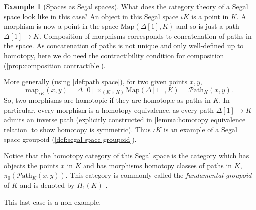 \documentclass[11pt, a4paper]{amsart}
\newcommand{\Map}{\mathrm{Map}}
\newcommand{\map}{\mathrm{map}}
\newcommand{\Path}{\mathscr{P}\mathrm{ath}}
\theoremstyle{definition}
\newtheorem{example}[equation]{Example}
\theoremstyle{remark}
\numberwithin{equation}{section}
\begin{document}
\begin{example}[Spaces as Segal spaces]
  What does the category theory of a Segal space look like in this case? An object in this Segal space $\iota K$ is a point in $K$. A morphism is now a point in the space $\Map(\Delta[1],K)$ and so is just a path $\Delta[1] \to K$. Composition of morphisms corresponds to concatenation of paths in the space. As concatenation of paths is not unique and only well-defined up to homotopy, here we do need the contractibility condition for composition (\cref{prop:composition contractible}).

  More generally (using \cref{def:path space}), for two given points $x,y$, 
  \[\map_{\iota K}(x,y) = \Delta[0] \times_{(K \times K)} \Map(\Delta[1],K)  = \Path_K(x,y).\]
  So, two morphisms are homotopic if they are homotopic as paths in $K$. In particular, every morphism is a homotopy equivalence, as every path $\Delta[1] \to K$ admits an inverse path (explicitly constructed in \cref{lemma:homotopy equivalence relation} to show homotopy is symmetric). Thus $\iota K$ is an example of a Segal space groupoid (\cref{def:segal space groupoid}).
  
  Notice that the homotopy category of this Segal space is the category which has objects the points $x$ in $K$ and has morphisms homotopy classes of paths in $K$, $\pi_0(\Path_K(x,y))$. This category is commonly called the \emph{fundamental groupoid} of $K$ and is denoted by $\Pi_1(K)$ \cite[Section 2.5]{tomdieck2008algebraictopology}.
 \end{example}

 This last case is a non-example.
\end{document}
